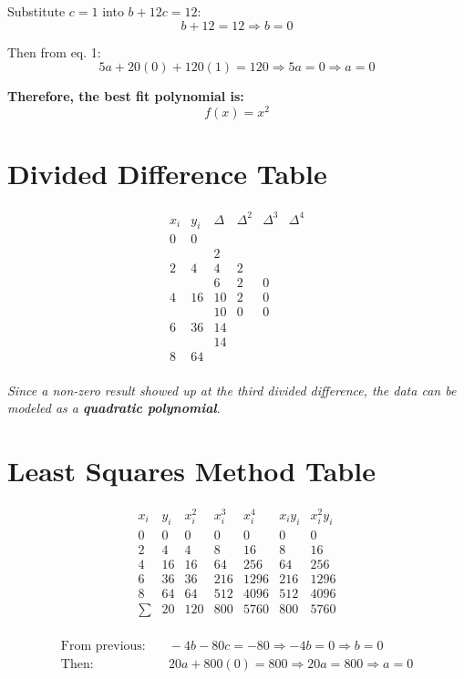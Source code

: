 \documentclass[legalpaper,11pt,extrafontsizes,oneside,openany]{memoir}
\begin{document}
Substitute \(c = 1\) into \(b + 12c = 12\):
\[
b + 12 = 12 \Rightarrow b = 0
\]

Then from eq. 1:
\[
5a + 20(0) + 120(1) = 120 \Rightarrow 5a = 0 \Rightarrow a = 0
\]

\textbf{Therefore, the best fit polynomial is:}
\[
f(x) = x^2
\]

\section*{Divided Difference Table}
\[
\begin{array}{c|c|c|c|c|c}
x_i & y_i & \Delta & \Delta^2 & \Delta^3 & \Delta^4 \\
\hline
0 & 0 &   &   &   & \\
  &   & 2 &   &   & \\
2 & 4 & 4 & 2 &   & \\
  &   & 6 & 2 & 0 & \\
4 & 16 & 10 & 2 & 0 & \\
  &   & 10 & 0 & 0 & \\
6 & 36 & 14 &   &   & \\
  &   & 14 &   &   & \\
8 & 64 &   &   &   & \\
\end{array}
\]

\emph{Since a non-zero result showed up at the third divided difference, the data can be modeled as a \textbf{quadratic polynomial}.}

\section*{Least Squares Method Table}
\[
\begin{array}{c|c|c|c|c|c|c}
x_i & y_i & x_i^2 & x_i^3 & x_i^4 & x_i y_i & x_i^2 y_i \\
\hline
0 & 0 & 0 & 0 & 0 & 0 & 0 \\
2 & 4 & 4 & 8 & 16 & 8 & 16 \\
4 & 16 & 16 & 64 & 256 & 64 & 256 \\
6 & 36 & 36 & 216 & 1296 & 216 & 1296 \\
8 & 64 & 64 & 512 & 4096 & 512 & 4096 \\
\hline
\sum & 20 & 120 & 800 & 5760 & 800 & 5760 \\
\end{array}
\]

\begin{align*}
\text{From previous:} & \quad -4b - 80c = -80 \Rightarrow -4b = 0 \Rightarrow b = 0 \\
\text{Then:} & \quad 20a + 800(0) = 800 \Rightarrow 20a = 800 \Rightarrow a = 0
\end{align*}
\end{document}
